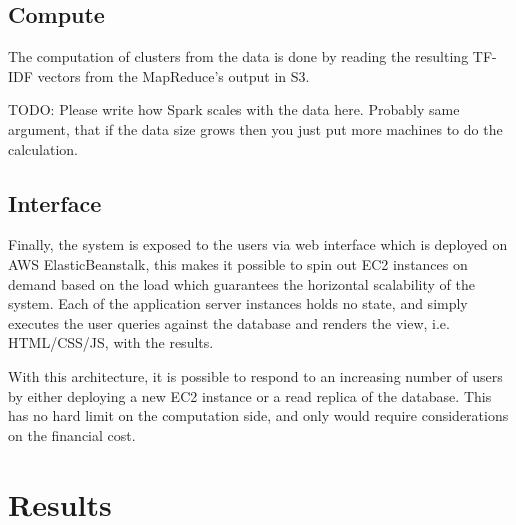 \documentclass[11pt,a4paper]{scrartcl}
\begin{document}
  \subsection{Compute}
  
  The computation of clusters from the data is done by reading the resulting
  TF-IDF vectors from the MapReduce's output in S3. 
  
  TODO: Please write how Spark scales with the data here. Probably same argument, that if the data size grows then you just put more machines to do the calculation.
  
  \subsection{Interface}
  
  Finally, the system is exposed to the users via web interface which is deployed
  on AWS ElasticBeanstalk, this makes it possible to spin out EC2 instances on
  demand based on the load which guarantees the horizontal scalability of
  the system. Each of the application server instances holds no state, and simply
  executes the user queries against the database and renders the view, i.e.
  HTML/CSS/JS, with the results.
  
  With this architecture, it is possible to respond to an increasing number of
  users by either deploying a new EC2 instance or a read replica of the
  database. This has no hard limit on the computation side, and only
  would require considerations on the financial cost.
  
  \section{Results}
\end{document}
